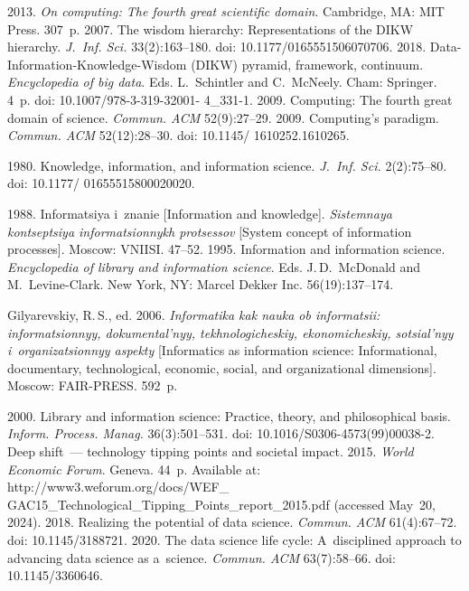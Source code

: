 \begin{multicols}{2}
{{\begin{thebibliography}{99}
 2013. \textit{On computing: The fourth great scientific 
domain}. Cambridge, MA: MIT Press. 307~p.
 2007. The wisdom hierarchy: Representations of the DIKW 
hierarchy. \textit{J.~Inf. Sci.} 33(2):163--180. doi: 10.1177/0165551506070706.
 2018.  
Data-Information-Knowledge-Wisdom (DIKW) pyramid, framework, continuum. 
\textit{Encyclopedia of big data}. Eds. L.~Schintler and C.~McNeely. Cham: 
Springer. 4~p. doi: 10.1007/978-3-319-32001- 4\_331-1.
 2009. Computing: The fourth great domain 
of science. \textit{Commun. ACM} 52(9):27--29.
 2009. Computing's paradigm. \textit{Commun. 
ACM} 52(12):28--30. doi: 10.1145/ 1610252.1610265.

 1980. Knowledge, information, and information science. 
\textit{J.~Inf. Sci.} 2(2):75--80. doi: 10.1177/ 01655515800020020.

 1988. Informatsiya i~znanie [Information and knowledge]. 
\textit{Sistemnaya kontseptsiya in\-for\-ma\-tsi\-on\-nykh protsessov} [System concept of 
information processes]. Moscow: VNIISI. 47--52.
 1995. Information and information science. 
\textit{Encyclopedia of library and information science}. Eds. J.\,D.~McDonald and 
M.~Levine-Clark. New York, NY: Marcel Dekker Inc. 56(19):137--174.

Gilyarevskiy, R.\,S., ed. 2006. \textit{Informatika kak nauka ob informatsii: 
informatsionnyy, dokumental'nyy, tekh\-no\-lo\-gi\-che\-skiy, ekonomicheskiy, sotsial'nyy 
i~organizatsionnyy aspekty} [Informatics as information science: Informational, 
documentary, technological, economic, social, and organizational dimensions]. 
Moscow: FAIR-PRESS. 592~p.

 2000. Library and information science: Practice, theory, and 
philosophical basis. \textit{Inform. Process. Manag.} 36(3):501--531. doi:  
10.1016/S0306-\mbox{4573(99)00038-2}.
Deep shift~--- technology tipping points and societal impact. 2015. \textit{World Economic 
Forum}. Geneva. 44~p. Available at: {\sf 
http://www3.weforum.org/docs/WEF\_ GAC15\_Technological\_Tipping\_Points\_report\_2015.pdf} (accessed May~20, 
2024).
 2018. Realizing the potential of data science. \textit{Commun. ACM} 
61(4):67--72. doi: 10.1145/3188721.
 2020. The data science life cycle: A~disciplined approach to 
advancing data science as a~science. \textit{Commun. ACM} 
 63(7):58--66. doi: 10.1145/3360646.


\end{thebibliography}}}
\end{multicols}
